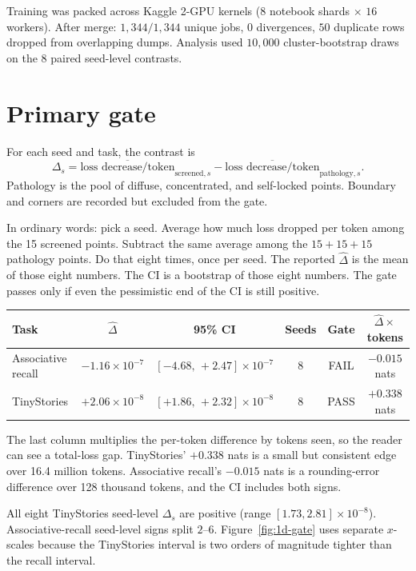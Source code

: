 \documentclass[11pt,a4paper]{report}
\begin{document}
Training was packed across Kaggle 2-GPU kernels ($8$ notebook shards $\times$ $16$ workers). After merge: $1{,}344/1{,}344$ unique jobs, $0$ divergences, $50$ duplicate rows dropped from overlapping dumps. Analysis used $10{,}000$ cluster-bootstrap draws on the $8$ paired seed-level contrasts.

\section{Primary gate}

For each seed and task, the contrast is
\[
\Delta_s
=
\overline{\text{loss decrease/token}}_{\text{screened},s}
-
\overline{\text{loss decrease/token}}_{\text{pathology},s}.
\]
Pathology is the pool of diffuse, concentrated, and self-locked points. Boundary and corners are recorded but excluded from the gate.

In ordinary words: pick a seed. Average how much loss dropped per token among the 15 screened points. Subtract the same average among the $15+15+15$ pathology points. Do that eight times, once per seed. The reported $\widehat\Delta$ is the mean of those eight numbers. The CI is a bootstrap of those eight numbers. The gate passes only if even the pessimistic end of the CI is still positive.

\begin{center}
{\small
\begin{tabular}{lccccc}
\toprule
Task & $\widehat\Delta$ & 95\% CI & Seeds & Gate & $\widehat\Delta\times$ tokens \\
\midrule
Associative recall & $-1.16\times 10^{-7}$ & $[-4.68,\,+2.47]\times 10^{-7}$ & 8 & FAIL & $-0.015$ nats \\
TinyStories & $+2.06\times 10^{-8}$ & $[+1.86,\,+2.32]\times 10^{-8}$ & 8 & PASS & $+0.338$ nats \\
\bottomrule
\end{tabular}}
\end{center}

The last column multiplies the per-token difference by tokens seen, so the reader can see a total-loss gap. TinyStories' $+0.338$ nats is a small but consistent edge over 16.4 million tokens. Associative recall's $-0.015$ nats is a rounding-error difference over 128 thousand tokens, and the CI includes both signs.

All eight TinyStories seed-level $\Delta_s$ are positive (range $[1.73,2.81]\times 10^{-8}$). Associative-recall seed-level signs split $2$--$6$. Figure~\ref{fig:1d-gate} uses separate $x$-scales because the TinyStories interval is two orders of magnitude tighter than the recall interval.
\end{document}
